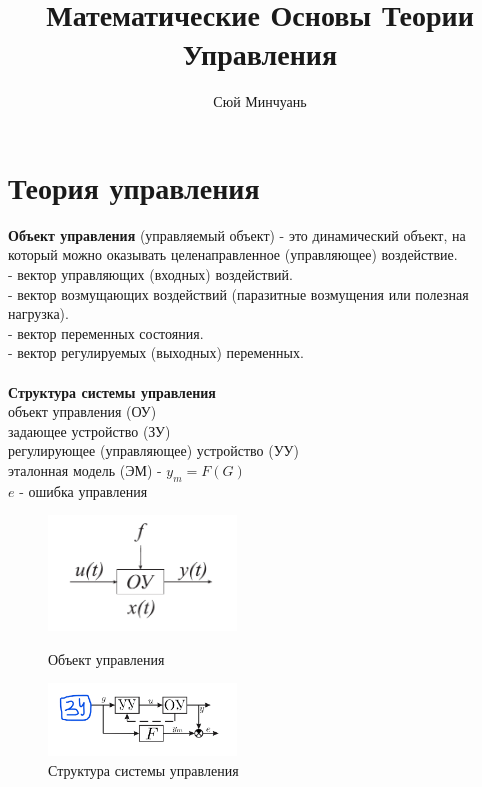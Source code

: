 \documentclass[A4]{article}
\begin{document}
\author{Сюй Минчуань}
\title{Математические Основы Теории Управления}
\maketitle
 \tableofcontents
\newpage
\section{Теория управления}
\textbf{Объект управления} (управляемый объект) - это динамический объект, на который можно оказывать целенаправленное (управляющее) воздействие.\\
 - вектор управляющих (входных) воздействий.\\
 - вектор возмущающих воздействий (паразитные возмущения или полезная нагрузка).\\
 - вектор переменных состояния.\\
 - вектор регулируемых (выходных) переменных.\\
\\
\textbf{Структура системы управления}\\
объект управления (ОУ)\\
задающее устройство (ЗУ)\\
регулирующее (управляющее) устройство (УУ)\\
эталонная модель (ЭМ) - $y_m=F(G)$\\
$e$ - ошибка управления \\

\begin{figure}[htbp] 
	\centering 
	\begin{minipage}[t]{0.48\textwidth} 
		\centering 
		\includegraphics[width=5cm]{1} 
		\caption{Объект управления}
		\label{fig:1}
	\end{minipage} 
	\begin{minipage}[t]{0.48\textwidth} 
		\centering 
		\includegraphics[width=5cm]{2} 
		\caption{Структура системы управления} 
		\label{fig:2}
	\end{minipage} 
\end{figure}
\end{document}
